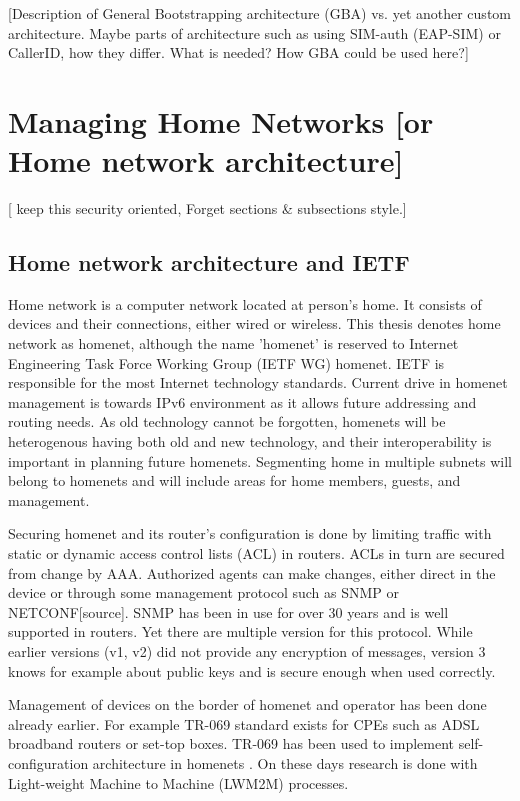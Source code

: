 \documentclass[12pt,a4paper,english]{tutthesis}
\begin{document}
[Description of General Bootstrapping architecture (GBA) vs. yet
another custom architecture. Maybe parts of architecture
such as using SIM-auth (EAP-SIM) or CallerID, how they differ. 
What is needed? How GBA could be used here?]
\chapter{Managing Home Networks [or Home network architecture]}
\label{sec-3}
[ keep this security oriented, Forget sections \& subsections style.]

\section{Home network architecture and IETF}
\label{sec-3-1}


Home network is a computer network located at person's home. It consists
of devices and their connections, either wired or wireless.  This
thesis denotes home network as homenet, although the name 'homenet'
is reserved to Internet Engineering Task Force Working Group (IETF WG) homenet.
IETF is responsible for the most Internet technology standards.
Current drive in homenet management is towards IPv6 environment
 as it allows future  addressing and routing needs. As old technology
cannot be forgotten, homenets will be heterogenous having both
old and new technology, and their interoperability is important in
planning future homenets. Segmenting home in multiple subnets will belong
to homenets and will include areas for home members, guests,
and management.



Securing homenet and its router's configuration is done by limiting
traffic with static or dynamic access control lists (ACL) in
routers. ACLs in turn are secured from change by AAA. Authorized
agents can make changes, either direct in the device or through some
management protocol such as SNMP or NETCONF[source].  SNMP has been in
use for over 30 years and is well supported in routers. Yet there are
multiple version for this protocol. While earlier versions (v1, v2)
did not provide any encryption of messages, version 3 knows for example
about public keys and is secure enough when used correctly.


Management of devices on the border of homenet and operator has 
been done already earlier. For example TR-069 standard
exists \cite{iptvtr069} for CPEs such as ADSL broadband routers or
set-top boxes. TR-069 has been used to implement self-configuration
archi\-tecture in
homenets \cite{tr069rachidi2011}.
On these days research is done with Light-weight Machine to Machine
(LWM2M) processes. 
\end{document}
